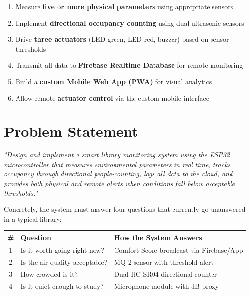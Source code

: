 \documentclass[12pt,a4paper]{article}
\begin{document}
\begin{enumerate}[leftmargin=1.5cm]
  \item Measure \textbf{five or more physical parameters} using appropriate sensors
  \item Implement \textbf{directional occupancy counting} using dual ultrasonic sensors
  \item Drive \textbf{three actuators} (LED green, LED red, buzzer) based on sensor thresholds
  \item Transmit all data to \textbf{Firebase Realtime Database} for remote monitoring
  \item Build a \textbf{custom Mobile Web App (PWA)} for visual analytics
  \item Allow remote \textbf{actuator control} via the custom mobile interface
\end{enumerate}

\newpage

\section{Problem Statement}

\begin{mdframed}[linecolor=primary, linewidth=1.2pt, leftmargin=0.5cm, rightmargin=0.5cm]
\textit{"Design and implement a smart library monitoring system using the ESP32 microcontroller that measures environmental parameters in real time, tracks occupancy through directional people-counting, logs all data to the cloud, and provides both physical and remote alerts when conditions fall below acceptable thresholds."}
\end{mdframed}

\vspace{0.5cm}

\noindent Concretely, the system must answer four questions that currently go unanswered in a typical library:

\begin{center}
\begin{tabular}{c p{5cm} p{7cm}}
\toprule
\textbf{\#} & \textbf{Question} & \textbf{How the System Answers} \\
\midrule
1 & Is it worth going right now? & Comfort Score broadcast via Firebase/App \\
2 & Is the air quality acceptable? & MQ-2 sensor with threshold alert \\
3 & How crowded is it? & Dual HC-SR04 directional counter \\
4 & Is it quiet enough to study? & Microphone module with dB proxy \\
\bottomrule
\end{tabular}
\end{center}
\end{document}
